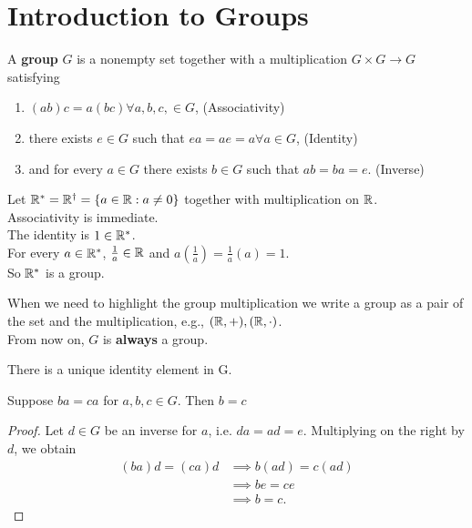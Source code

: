 \chapter{Introduction to Groups}

\begin{definition}[a group]
    A \textbf{group} $G$ is a nonempty set together with a multiplication $G \times G \to G$ satisfying
    \begin{enumerate}
        \item $(ab)c = a(bc) \forall a, b, c, \in G$, (Associativity)
        \item there exists $e \in G$ such that $ea = ae = a \forall a \in G$, (Identity)
        \item and for every $a \in G$ there exists $b \in G$ such that $ab = ba = e$. (Inverse)
    \end{enumerate}
\end{definition}

\begin{example}[a group]
    Let $\mathbb{R}^* = \mathbb{R}^\dag = \{a \in \mathbb{R}: a \neq 0\}$ together with multiplication on $\mathbb{R}$. \\
    Associativity is immediate. \\
    The identity is $1 \in \mathbb{R}^*$. \\
    For every $a \in \mathbb{R}^*$, $\frac{1}{a} \in \mathbb{R}$ and $a(\frac{1}{a}) = \frac{1}{a}(a) = 1$. \\
    So $\mathbb{R}^*$ is a group.
\end{example}

\begin{remark}
    When we need to highlight the group multiplication we write a group as a pair of the set and the multiplication, e.g., $(\mathbb{R}, +), (\mathbb{R}, \cdot)$. \\
    From now on, $G$ is \textbf{always} a group.
\end{remark}

\begin{theorem}
    There is a unique identity element in G.
\end{theorem}

\begin{theorem}[Cancellation] \label{thm:Cancellation}
    Suppose $ba = ca$ for $a,b,c \in G$. Then $b = c$
\end{theorem}
\begin{proof}
    Let $d \in G$ be an inverse for $a$, i.e. $da = ad = e$.
    Multiplying on the right by $d$, we obtain
    \begin{align*}
        (ba)d = (ca)d &\implies b(ad) = c(ad) \\
        &\implies be = ce \\
        &\implies b = c.
    \end{align*}
\end{proof}

